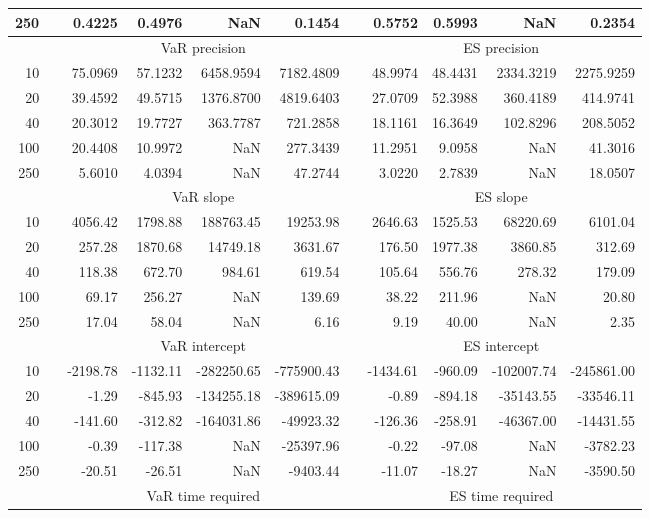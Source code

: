 {\begin{table}[h]
\begin{tabular}{rr rrrr r rrrr}
250 && 0.4225  & 0.4976  &    NaN & 0.1454 && 0.5752  & 0.5993  &    NaN & 0.2354 \\ 
\hline 
 & & \multicolumn{4}{c}{VaR precision} &&  \multicolumn{4}{c}{ES precision} \\ \cline{3-6}  \cline{8-11}
10 && 75.0969  & 57.1232  & 6458.9594 & 7182.4809 & & 48.9974  & 48.4431  & 2334.3219 & 2275.9259 \\ 
20 && 39.4592  & 49.5715  & 1376.8700 & 4819.6403 & & 27.0709  & 52.3988  & 360.4189 & 414.9741 \\ 
40 && 20.3012  & 19.7727  & 363.7787 & 721.2858 & & 18.1161  & 16.3649  & 102.8296 & 208.5052 \\ 
100 && 20.4408  & 10.9972  &    NaN & 277.3439 & & 11.2951  & 9.0958  &    NaN & 41.3016 \\ 
250 && 5.6010  & 4.0394  &    NaN & 47.2744 & & 3.0220  & 2.7839  &    NaN & 18.0507 \\ 
\hline 
 & & \multicolumn{4}{c}{ VaR slope} &&  \multicolumn{4}{c}{ES slope} \\ \cline{3-6}  \cline{8-11}
10 && 4056.42  & 1798.88  & 188763.45 & 19253.98 && 2646.63  & 1525.53  & 68220.69 & 6101.04 \\ 
20 && 257.28  & 1870.68  & 14749.18 & 3631.67 && 176.50  & 1977.38  & 3860.85 & 312.69 \\ 
40 && 118.38  & 672.70  & 984.61 & 619.54 && 105.64  & 556.76  & 278.32 & 179.09 \\ 
100 && 69.17  & 256.27  &  NaN & 139.69 && 38.22  & 211.96  &  NaN & 20.80 \\ 
250 && 17.04  & 58.04  &  NaN & 6.16 && 9.19  & 40.00  &  NaN & 2.35 \\ 
\hline 
 & & \multicolumn{4}{c}{ VaR intercept} &&  \multicolumn{4}{c}{ES intercept} \\ \cline{3-6}  \cline{8-11}
10 && -2198.78  & -1132.11  & -282250.65 & -775900.43 && -1434.61  & -960.09  & -102007.74 & -245861.00 \\ 
20 && -1.29  & -845.93  & -134255.18 & -389615.09 && -0.89  & -894.18  & -35143.55 & -33546.11 \\ 
40 && -141.60  & -312.82  & -164031.86 & -49923.32 && -126.36  & -258.91  & -46367.00 & -14431.55 \\ 
100 && -0.39  & -117.38  &  NaN & -25397.96 && -0.22  & -97.08  &  NaN & -3782.23 \\ 
250 && -20.51  & -26.51  &  NaN & -9403.44 && -11.07  & -18.27  &  NaN & -3590.50 \\ 
\hline 
 & & \multicolumn{4}{c}{VaR time required} && \multicolumn{4}{c}{ES time required} \\ \cline{3-6}  \cline{8-11}

\end{tabular}
\end{table}}
